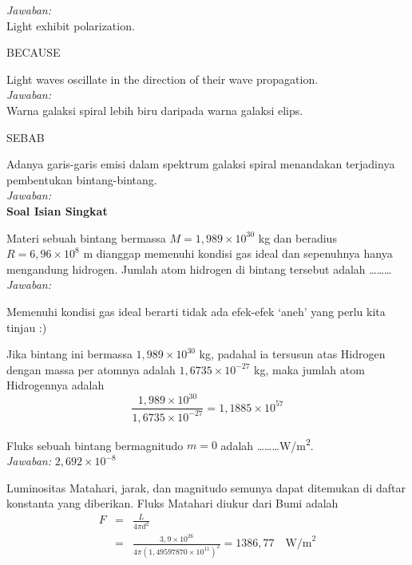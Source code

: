 \documentclass[11pt,fleqn]{exam}
\begin{document}
\begin{questions}
\textit{Jawaban: } \\

\question Light exhibit polarization.
\begin{center}
BECAUSE
\end{center}
Light waves oscillate in the direction of their wave propagation.\\

\textit{Jawaban: }\\

\question Warna galaksi spiral lebih biru daripada warna galaksi elips.
\begin{center}
SEBAB
\end{center}
Adanya garis-garis emisi dalam spektrum galaksi spiral menandakan terjadinya pembentukan bintang-bintang.\\

\textit{Jawaban: } \\

\vspace{0.5cm}
\textbf{Soal Isian Singkat}

\question Materi sebuah bintang bermassa $M=1,989\times 10^{30}$ kg dan beradius $R=6,96\times 10^8$ m dianggap memenuhi kondisi gas ideal dan sepenuhnya hanya mengandung hidrogen. Jumlah atom hidrogen di bintang tersebut adalah \ldots\ldots\ldots \\

\textit{Jawaban: }

Memenuhi kondisi gas ideal berarti tidak ada efek-efek `aneh' yang perlu kita tinjau :)

Jika bintang ini bermassa $1,989 \times 10^{30}$ kg, padahal ia tersusun atas Hidrogen dengan massa per atomnya adalah $1,6735 \times 10^{-27}$ kg, maka jumlah atom Hidrogennya adalah 
$$\frac{1,989 \times 10^{30}}{1,6735 \times 10^{-27}} = 1,1885 \times 10^{57}$$


\vspace{0.3cm}
\question Fluks sebuah bintang bermagnitudo $m=0$ adalah \ldots\ldots\ldots W/m\textsuperscript{2}.\\

\textit{Jawaban: } $2,692 \times 10^{-8}$

Luminositas Matahari, jarak, dan magnitudo semunya dapat ditemukan di daftar konstanta yang diberikan. Fluks Matahari diukur dari Bumi adalah
\begin{eqnarray*}
F &=& \frac{L}{4 \pi d^2} \\
  &=& \frac{3,9 \times 10^{26}}{4 \pi (1,49597870 \times 10^{11})^2} = 1386,77 \quad \text{W/m}^{2}
\end{eqnarray*}


\end{questions}
\end{document}
